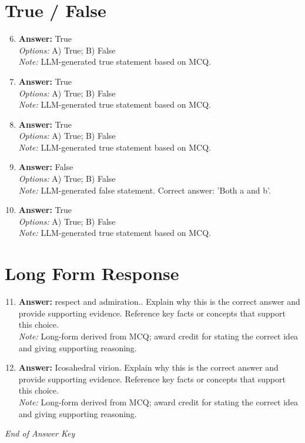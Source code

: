 \documentclass[12pt]{article}
\begin{document}
\section*{True / False}
\begin{enumerate}[label=\arabic*.]
\setcounter{enumi}{5}
\item \textbf{Answer:} True
\\ \textit{Options:} A) True; B) False
\\ \textit{Note:} LLM-generated true statement based on MCQ.
\item \textbf{Answer:} True
\\ \textit{Options:} A) True; B) False
\\ \textit{Note:} LLM-generated true statement based on MCQ.
\item \textbf{Answer:} True
\\ \textit{Options:} A) True; B) False
\\ \textit{Note:} LLM-generated true statement based on MCQ.
\item \textbf{Answer:} False
\\ \textit{Options:} A) True; B) False
\\ \textit{Note:} LLM-generated false statement. Correct answer: 'Both a and b'.
\item \textbf{Answer:} True
\\ \textit{Options:} A) True; B) False
\\ \textit{Note:} LLM-generated true statement based on MCQ.
\end{enumerate}

\section*{Long Form Response}
\begin{enumerate}[label=\arabic*.]
\setcounter{enumi}{10}
\item \textbf{Answer:} respect and admiration.. Explain why this is the correct answer and provide supporting evidence. Reference key facts or concepts that support this choice.
\\ \textit{Note:} Long-form derived from MCQ; award credit for stating the correct idea and giving supporting reasoning.
\item \textbf{Answer:} Icosahedral virion. Explain why this is the correct answer and provide supporting evidence. Reference key facts or concepts that support this choice.
\\ \textit{Note:} Long-form derived from MCQ; award credit for stating the correct idea and giving supporting reasoning.
\end{enumerate}

\vfill
\noindent\textit{End of Answer Key}
\end{document}
